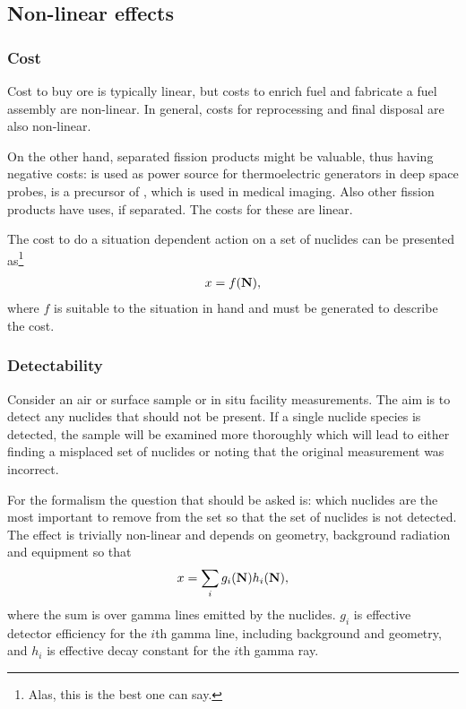 \subsection{Non-linear effects}

\subsubsection*{Cost}

Cost to buy ore is typically linear, but costs to enrich fuel and fabricate a fuel assembly are non-linear. In general, costs for reprocessing and final disposal are also non-linear.

On the other hand, separated fission products might be valuable, thus having negative costs:  is used as power source for thermoelectric generators in deep space probes,  is a precursor of , which is used in medical imaging. Also other fission products have uses, if separated. The costs for these are linear.~\cite{Sorensen_2010}

The cost to do a situation dependent action on a set of nuclides can be presented as\footnote{Alas, this is the best one can say.}
%
\begin{gather}
x=f(\mathbf{N}),
\end{gather}
%
where $f$ is suitable to the situation in hand and must be generated to describe the cost.


\subsubsection*{Detectability}%

Consider an air or surface sample or in situ facility measurements. The aim is to detect any nuclides that should not be present. If a single nuclide species is detected, the sample will be examined more thoroughly which will lead to either finding a misplaced set of nuclides or noting that the original measurement was incorrect.

For the formalism the question that should be asked is: which nuclides are the most important to remove from the set so that the set of nuclides is not detected. The effect is trivially non-linear and depends on geometry, background radiation and equipment so that
%
\begin{gather}
x = \sum_ig_i(\mathbf{N})h_i(\mathbf{N}),
\end{gather}
%
where the sum is over gamma lines emitted by the nuclides. $g_i$ is effective detector efficiency for the $i$th gamma line, including background and geometry, and $h_i$ is effective decay constant for the $i$th gamma ray.

